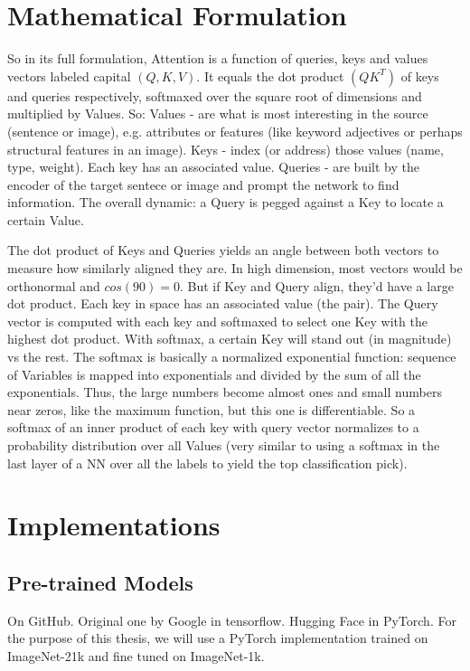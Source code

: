 \section{Mathematical Formulation}

So in its full formulation, Attention is a function of queries, keys and values 
vectors labeled capital $(Q,K,V)$. 
It equals the dot product $(QK^T)$ of keys and queries respectively, softmaxed over 
the square root of dimensions and multiplied by Values.
So:
Values - are what is most interesting in the source (sentence or image), 
e.g. attributes or features (like keyword adjectives or perhaps structural 
features in an image).
Keys - index (or address) those values (name, type, weight). Each key has an 
associated value. Queries - are built by the encoder of the target sentece or 
image and prompt the network to find information. 
The overall dynamic: a Query is pegged against a Key to locate a certain Value.	

The dot product of Keys and Queries yields an angle between both vectors to measure 
how similarly aligned they are. In high dimension, most vectors would be orthonormal 
and $cos(90)=0$. But if Key and Query align, they'd have a large dot product. 
Each key in space has an associated value (the pair). The Query vector is computed with 
each key and softmaxed to select one Key with the highest dot product. With softmax, 
a certain Key will stand out (in magnitude) vs the rest.
The softmax is basically a normalized exponential function: sequence of Variables is 
mapped into exponentials and divided by the sum of all the exponentials. Thus, the 
large numbers become almost ones and small numbers near zeros, like the maximum 
function, but this one is differentiable. 
So a softmax of an inner product of each key with query vector normalizes to a 
probability distribution over all Values (very similar to using a softmax in the last 
layer of a NN over all the labels to yield the top classification pick). 


\newpage

\section{Implementations}
\subsection{Pre-trained Models}

On GitHub.
Original one by Google in tensorflow.
Hugging Face in PyTorch.
For the purpose of this thesis, we will use a PyTorch implementation trained on ImageNet-21k
and fine tuned on ImageNet-1k.

